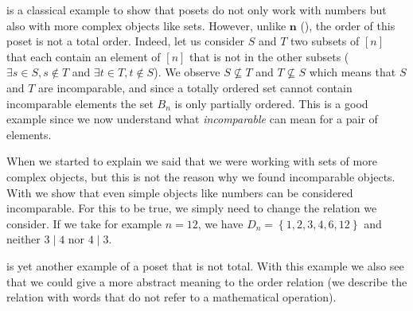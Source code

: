  is a classical example to show that posets do not only work with numbers but also with more complex objects like sets. However, unlike $\bm{n}$ (), the order of this poset is not a total order. Indeed, let us consider $S$ and $T$ two subsets of $[n]$ that each contain an element of $[n]$ that is not in the other subsets ($\exists s \in S, s \notin T$ and $\exists t \in T, t \notin S$). We observe $S \nsubseteq T$ and $T \nsubseteq S$ which means that $S$ and $T$ are incomparable, and since a totally ordered set cannot contain incomparable elements the set $B_n$ is only partially ordered. This is a good example since we now understand what \emph{incomparable} can mean for a pair of elements.


When we started to explain  we said that we were working with sets of more complex objects, but this is not the reason why we found incomparable objects. With  we show that even simple objects like numbers can be considered incomparable. For this to be true, we simply need to change the relation we consider. If we take for example $n = 12$, we have $D_n = \left\{{1, 2, 3, 4, 6, 12}\right\}$ and neither $3 \mid 4$ nor $4 \mid 3$.


 is yet another example of a poset that is not total. With this example we also see that we could give a more abstract meaning to the order relation (we describe the relation with words that do not refer to a mathematical operation).